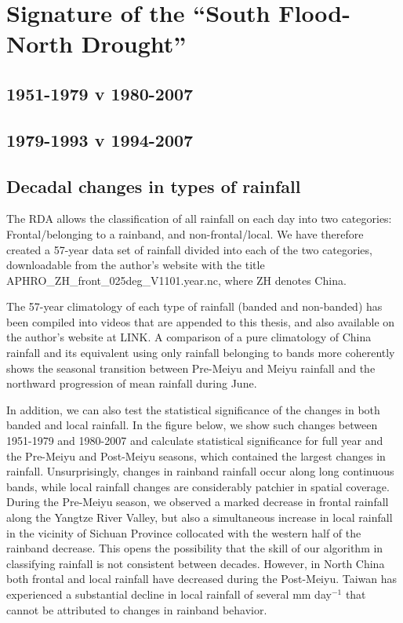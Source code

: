 \section{Signature of the ``South Flood-North Drought''}
\subsection{1951-1979 v 1980-2007}
\subsection{1979-1993 v 1994-2007}


\subsection{Decadal changes in types of rainfall}
The RDA allows the classification of all rainfall on each day into two categories: Frontal/belonging to a rainband, and non-frontal/local. We have therefore created a 57-year data set of rainfall divided into each of the two categories, downloadable from the author's website with the title APHRO\_ZH\_front\_025deg\_V1101.year.nc, where ZH denotes China.

The 57-year climatology of each type of rainfall (banded and non-banded) has been compiled into videos that are appended to this thesis, and also available on the author's website at LINK. A comparison of a pure climatology of China rainfall and its equivalent using only rainfall belonging to bands more coherently shows the seasonal transition between Pre-Meiyu and Meiyu rainfall and the northward progression of mean rainfall during June.

In addition, we can also test the statistical significance of the changes in both banded and local rainfall. In the figure below, we show such changes between 1951-1979 and 1980-2007 and calculate statistical significance for full year and the Pre-Meiyu and Post-Meiyu seasons, which contained the largest changes in rainfall. Unsurprisingly, changes in rainband rainfall occur along long continuous bands, while local rainfall changes are considerably patchier in spatial coverage. During the Pre-Meiyu season, we observed a marked decrease in frontal rainfall along the Yangtze River Valley, but also a simultaneous increase in local rainfall in the vicinity of Sichuan Province collocated with the western half of the rainband decrease. This opens the possibility that the skill of our algorithm in classifying rainfall is not consistent between decades. However, in North China both frontal and local rainfall have decreased during the Post-Meiyu. Taiwan has experienced a substantial decline in local rainfall of several mm day$^{-1}$ that cannot be attributed to changes in rainband behavior.

